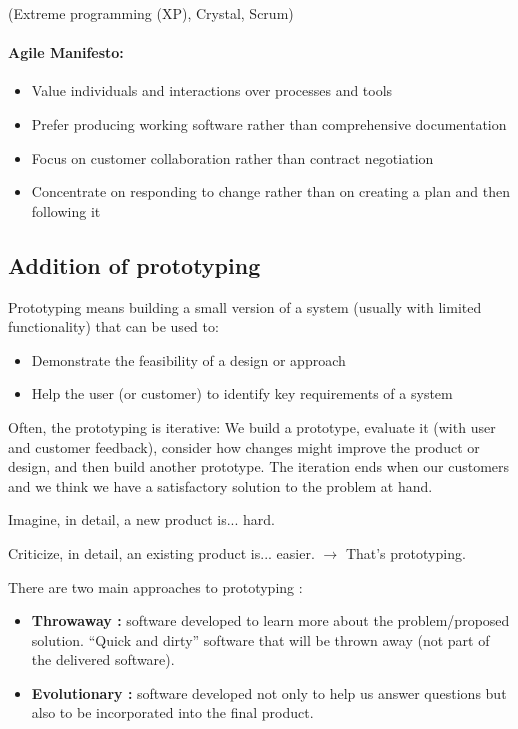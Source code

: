 (Extreme programming (XP), Crystal, Scrum)


\paragraph{Agile Manifesto:}

\begin{itemize}
    \item Value individuals and interactions over processes and tools
    \item Prefer producing working software rather than comprehensive documentation
    \item Focus on customer collaboration rather than contract negotiation
    \item Concentrate on responding to change rather than on creating a plan and then following it
\end{itemize}



\subsection{Addition of prototyping}

Prototyping means building a small version of a system (usually with limited
functionality) that can be used to:

\begin{itemize}
    \item Demonstrate the feasibility of a design or approach
    \item Help the user (or customer) to identify key requirements of a system
\end{itemize}


Often, the prototyping is iterative: We build a prototype, evaluate it (with
user and customer feedback), consider how changes might improve the product or
design, and then build another prototype. The iteration ends when our customers
and we think we have a satisfactory solution to the problem at hand.

\begin{center}
Imagine, in detail, a new product is... hard.


Criticize, in detail, an existing product is... easier.
 $\rightarrow$ That's prototyping.
 \end{center}


There are two main approaches to prototyping :

\begin{itemize}
    \item \textbf{Throwaway :} software developed to learn more about the
    problem/proposed solution. “Quick and dirty” software that will be thrown
    away (not part of the delivered software).
    \item \textbf{Evolutionary :} software developed not only to help us answer questions
    but also to be incorporated into the final product.
\end{itemize}
